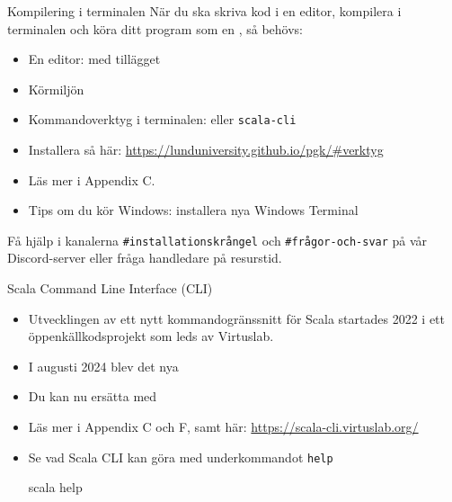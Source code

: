 
\begin{Slide}{Kompilering i terminalen}
  När du ska skriva kod i en editor, kompilera i terminalen och köra ditt program som en , så behövs: 
  \begin{itemize}
    \item En editor:  med tillägget 
    \item Körmiljön  
    \item Kommandoverktyg i terminalen:  eller \texttt{scala-cli}
    \item Installera så här: \url{https://lunduniversity.github.io/pgk/#verktyg}
    \item Läs mer i Appendix C.
    \item Tips om du kör Windows: installera %
    {nya Windows Terminal}

  \end{itemize}
    Få hjälp i kanalerna \texttt{\#installationskrångel} och \texttt{\#frågor-och-svar} på vår Discord-server eller fråga handledare på resurstid.
  
\end{Slide}

\begin{Slide}{Scala Command Line Interface (CLI)}
\begin{itemize}
\item Utvecklingen av ett nytt kommandogränssnitt  för Scala startades 2022 i ett öppenkällkodsprojekt som leds av Virtuslab. 
\item I augusti 2024 blev  det nya %
\item Du kan nu ersätta  med 
\item Läs mer i Appendix C och F, samt här: \url{https://scala-cli.virtuslab.org/}
\item Se vad Scala CLI kan göra med underkommandot \texttt{help}
\begin{REPLnonum}
  scala help
\end{REPLnonum}
\end{itemize}
\end{Slide}

